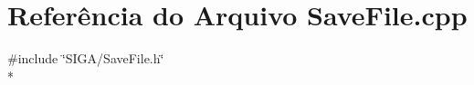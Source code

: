 \section{Referência do Arquivo Save\+File.\+cpp}
\label{_save_file_8cpp}
{\ttfamily \#include \char`\"{}S\+I\+G\+A/\+Save\+File.\+h\char`\"{}}\\*
